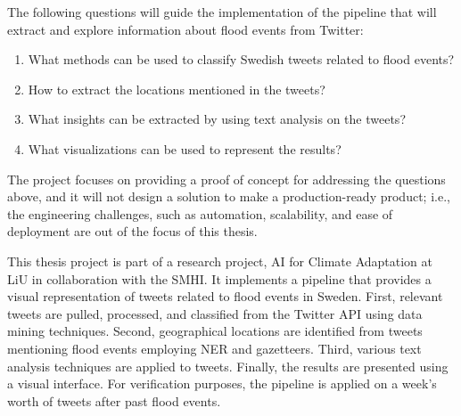 The following questions will guide the implementation of the pipeline that will extract and explore
information about flood events from Twitter:
\begin{enumerate} 
  \item What methods can be used to classify Swedish tweets related to flood events?
  \item How to extract the locations mentioned in the tweets? 
  \item What insights can be extracted by using text analysis on the tweets?
  \item What visualizations can be used to represent the results? 
\end{enumerate}

The project focuses on providing a proof of concept for addressing the questions above, and it will
not design a solution to make a production-ready product; i.e., the engineering challenges, such as
automation, scalability, and ease of deployment are out of the focus of this thesis. 

This thesis project is part of a research project, AI for Climate Adaptation
\cite{nesetAI4ClimateAdaptation} at \ac{LiU} in collaboration with the \ac{SMHI}. It implements a
pipeline that provides a visual representation of tweets related to flood events in Sweden. First,
relevant tweets are pulled, processed, and classified from the Twitter \ac{API} using data mining
techniques. Second, geographical locations are identified from tweets mentioning flood events employing
\ac{NER} and gazetteers. Third, various text analysis techniques are applied to tweets. Finally, the
results are presented using a visual interface. For verification purposes, the pipeline is applied
on a week's worth of tweets after past flood events.
